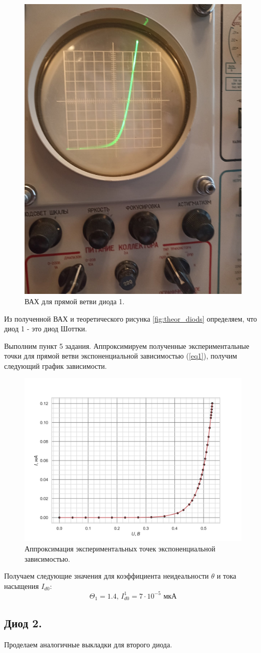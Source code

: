 \documentclass[a4paper, 12pt]{article}
\begin{document}
\begin{figure}[H]
    \centering
    \includegraphics[width=0.4\linewidth]{diod11.jpg}
    \caption{ВАХ для прямой ветви диода 1.}
\end{figure}


Из полученной ВАХ и теоретического рисунка \ref{fig:theor_diods} определяем, что диод 1 - это диод Шоттки.


Выполним пункт 5 задания. Аппроксимируем полученные экспериментальные точки для прямой ветви экспоненциальной зависимостью (\ref{eq1}), получим следующий график зависимости.

\begin{figure}[H]
    \centering
    \includegraphics[width=0.7\linewidth]{Diod_1_approximation.png}
    \caption{Аппроксимация экспериментальных точек экспоненциальной зависимостью.}
\end{figure}

Получаем следующие значения для коэффициента неидеальности $\theta$ и тока насыщения $I_{d0}$:
\[
\Theta_1 = 1.4, \, I^1_{d0} = 7 \cdot 10^{-5} \text{ мкА}
\]

\newpage

\subsection*{Диод 2.}
Проделаем аналогичные выкладки для второго диода. 
\end{document}
